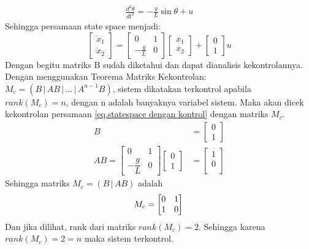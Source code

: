 \documentclass{article}
\begin{document}
\begin{align}
    \frac{d^2\theta}{dt^2} = -\frac{g}{L} \sin \theta + u \label{eq.input kontrol}
\end{align}
Sehingga persamaan state space menjadi: \\
\begin{equation}
    \begin{bmatrix} \dot{x}_1 \\ \dot{x}_2 \end{bmatrix} =
    \begin{bmatrix} 0 & 1 \\ -\frac{g}{L} & 0 \end{bmatrix}
    \begin{bmatrix} x_1 \\ x_2 \end{bmatrix} +
    \begin{bmatrix} 0 \\ 1 \end{bmatrix} u \label{eq.statespace dengan kontrol}
\end{equation}
Dengan begitu matriks B sudah diketahui dan dapat dianalisis kekontrolannya.
Dengan menggunakan Teorema Matriks Kekontrolan: $M_c = ( B \,|\, AB \,|\, ... \,|\,A^{n-1}B)$, sistem dikatakan terkontrol apabila $rank(M_c)=n$, dengan n adalah banyaknya variabel sistem. Maka akan dicek kekontrolan persamaan \eqref{eq.statespace dengan kontrol} dengan matriks $M_c$.
\begin{align*}
    B                   & = \begin{bmatrix} 0 \\ 1 \end{bmatrix} \\
    AB = \begin{bmatrix}
             0             & 1 \\
             -\dfrac{g}{L} & 0
         \end{bmatrix}
    \begin{bmatrix}
        0 \\ 1
    \end{bmatrix} & = \begin{bmatrix}
                          1 \\
                          0 \\
                      \end{bmatrix}
\end{align*}
Sehingga matriks $M_c = ( B\,|\,AB )$ adalah
\[
    M_c = \begin{bmatrix}
        0 & 1 \\
        1 & 0
    \end{bmatrix} \\
\]
Dan jika dilihat, rank dari matriks $rank(M_c) = 2$. Sehingga karena $rank(M_c) = 2 = n$ maka sistem terkontrol.
\end{document}
